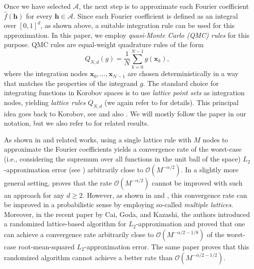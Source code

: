 \documentclass[pdflatex,sn-basic,Numbered]{sn-jnl}%
\newcommand{\bsh}{\boldsymbol{h}}
\newcommand{\bsx}{\boldsymbol{x}}
\newcommand{\Acal}{\mathcal{A}}
\theoremstyle{thmstyleone}%
\theoremstyle{thmstyletwo}%
\begin{document}
Once we have selected $\Acal$, the next step is to approximate each Fourier coefficient $\widehat{f}(\bsh)$ for every $\bsh\in\Acal$. Since each Fourier coefficient is defined as an integral over $[0,1]^d$, as shown above, a suitable integration rule can be used for this approximation. In this paper, we employ \textit{quasi-Monte Carlo (QMC) rules} for this purpose. QMC rules are equal-weight quadrature rules of the form 
\[
Q_{N,d}(g)=\frac{1}{N}\sum_{k=0}^{N-1} g(\bsx_k),
\]
where the integration nodes $\bsx_0,\ldots,\bsx_{N-1}$ are chosen deterministically in a way that matches the properties of the integrand $g$. The standard choice for integrating functions in Korobov spaces is to use \textit{lattice point sets} as integration nodes, yielding \textit{lattice rules} $Q_{N,d}$ (we again refer to  for details). This principal idea goes back to Korobov, see \cite{korobov1963numbertheoretic} and also \cite{hua1963applications}. We will mostly follow the paper \cite{kuo2006lattice} in our notation, but we also refer to \cite{li2003trigonometric,temlyakov1985approximaterussian, temlyakov1993approximate, zeng2006error} for related results.

As shown in \cite{kuo2006lattice} and related works, using a single lattice rule with $M$ nodes to approximate the Fourier coefficients yields a convergence rate of the worst-case (i.e., considering the supremum over all functions in the unit ball of the space) $L_2$-approximation error (see ) arbitrarily close to $\mathcal{O}(M^{-\alpha/2})$. In a slightly more general setting, \cite{byrenheid2017tight} proves that the rate $\mathcal{O}(M^{-\alpha/2})$ cannot be improved with such an approach for any $d\ge 2$. However, as shown in \cite{kaemmerer2019constructing} and \cite{kammerer2019approximation}, this convergence rate can be improved in a probabilistic sense by employing so-called \textit{multiple lattices}. Moreover, in the recent paper \cite{CGK24} by Cai, Goda, and Kazashi, the authors introduced a randomized lattice-based algorithm for $L_2$-approximation and proved that one can achieve a convergence rate arbitrarily close to $\mathcal{O}(M^{-\alpha/2 - 1/8})$ of the worst-case root-mean-squared $L_2$-approximation error. The same paper proves that this randomized algorithm cannot achieve a better rate than $\mathcal{O}(M^{-\alpha/2 - 1/2})$.
\end{document}
